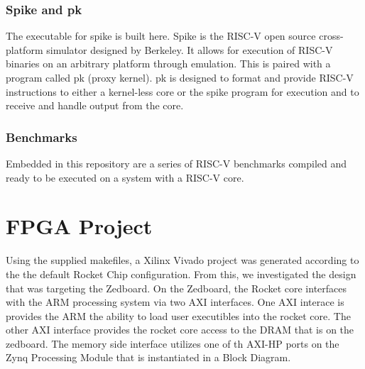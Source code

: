 \documentclass[journal]{IEEEtran}
\begin{document}
\subsubsection{Spike and pk}
The executable for spike is built here. Spike is the RISC-V open source cross-platform simulator designed by Berkeley. It allows for execution of RISC-V binaries on an arbitrary platform through emulation. This is paired with a program called pk (proxy kernel). pk is designed to format and provide RISC-V instructions to either a kernel-less core or the spike program for execution and to receive and handle output from the core. \newline

\subsubsection{Benchmarks}
Embedded in this repository are a series of RISC-V benchmarks compiled and ready to be executed on a system with a RISC-V core. 

\section{FPGA Project}
Using the supplied makefiles, a Xilinx Vivado project was generated according to the the default Rocket Chip configuration. From this,  we investigated the design that was targeting the Zedboard.
On the Zedboard, the Rocket core interfaces with the ARM processing system via two AXI interfaces. One AXI interace is provides the ARM the ability to load user executibles into the rocket core. The other AXI interface provides the rocket core access to the DRAM that is on the zedboard. The memory side interface utilizes one of th AXI-HP ports on the Zynq Processing Module that is instantiated in a Block Diagram.
\end{document}

